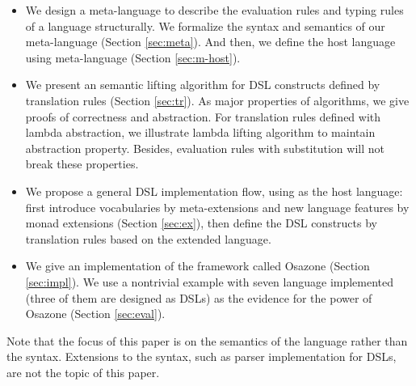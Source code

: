 \begin{itemize}
  \item We design a meta-language to describe the evaluation rules and typing rules of a language structurally.
    We formalize the syntax and semantics of our meta-language (Section \ref{sec:meta}).
    And then, we define the host language \STLC{} using meta-language (Section \ref{sec:m-host}).
  \item We present an semantic lifting algorithm for DSL constructs defined by translation rules (Section \ref{sec:tr}).
    As major properties of algorithms, we give proofs of correctness and abstraction. 
    For translation rules defined with lambda abstraction,
     we illustrate lambda lifting algorithm to maintain abstraction property.
    Besides, evaluation rules with substitution will not break these properties.
  \item We propose a general DSL implementation flow, using \STLC{} as the host language:
    first introduce vocabularies by meta-extensions and new language features by monad extensions (Section \ref{sec:ex}),
    then define the DSL constructs by translation rules based on the extended language.
  \item We give an implementation of the framework called Osazone (Section \ref{sec:impl}).
    We use a nontrivial example with seven language implemented (three of them are designed as DSLs) as the evidence for the power of Osazone (Section \ref{sec:eval}).
\end{itemize}
Note that the focus of this paper is on the semantics of the language rather than the syntax. 
Extensions to the syntax, such as parser implementation for DSLs, are not the topic of this paper.
